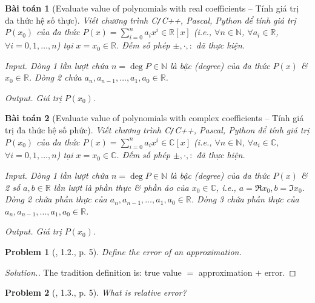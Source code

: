 \documentclass[oneside]{book}
\newtheorem{baitoan}{Bài toán}
\newtheorem{problem}{Problem}
\begin{document}
\begin{baitoan}[Evaluate value of polynomials with real coefficients -- Tính giá trị đa thức hệ số thực]
	Viết chương trình {\sf C{\tt/}C++, Pascal, Python} để tính giá trị $P(x_0)$ của đa thức $P(x) = \sum_{i=0}^n a_ix^i\in\mathbb{R}[x]$ (i.e., $\forall n\in\mathbb{N}$, $\forall a_i\in\mathbb{R}$, $\forall i = 0,1,\ldots,n$) tại $x = x_0\in\mathbb{R}$. Đếm số phép $\pm,\cdot,:$ đã thực hiện.
	\item {\sf Input.} Dòng 1 lần lượt chứa $n = \deg P\in\mathbb{N}$ là bậc (degree) của đa thức $P(x)$ \& $x_0\in\mathbb{R}$. Dòng 2 chứa  $a_n,a_{n-1},\ldots,a_1,a_0\in\mathbb{R}$.
	\item {\sf Output.} Giá trị $P(x_0)$.
\end{baitoan}

\begin{baitoan}[Evaluate value of polynomials with complex coefficients -- Tính giá trị đa thức hệ số phức]
	Viết chương trình {\sf C{\tt/}C++, Pascal, Python} để tính giá trị $P(x_0)$ của đa thức $P(x) = \sum_{i=0}^n a_ix^i\in\mathbb{C}[x]$ (i.e., $\forall n\in\mathbb{N}$, $\forall a_i\in\mathbb{C}$, $\forall i = 0,1,\ldots,n$) tại $x = x_0\in\mathbb{C}$. Đếm số phép $\pm,\cdot,:$ đã thực hiện.
	\item {\sf Input.} Dòng 1 lần lượt chứa $n = \deg P\in\mathbb{N}$ là bậc (degree) của đa thức $P(x)$ \& 2 số $a,b\in\mathbb{R}$ lần lượt là phần thực \& phần ảo của $x_0\in\mathbb{C}$, i.e., $a = \Re x_0,b = \Im x_0$. Dòng 2 chứa phần thực của $a_n,a_{n-1},\ldots,a_1,a_0\in\mathbb{R}$. Dòng 3 chứa phần thực của $a_n,a_{n-1},\ldots,a_1,a_0\in\mathbb{R}$.
	\item {\sf Output.} Giá trị $P(x_0)$.
\end{baitoan}

\begin{problem}[\cite{Scheid1989}, 1.2., p. 5]
	Define the error of an approximation.
\end{problem}

\begin{proof}[Solution.]
	The tradition definition is: true value $=$ approximation $+$ error.
\end{proof}

\begin{problem}[\cite{Scheid1989}, 1.3., p. 5]
	What is relative error?
\end{problem}

\end{document}

